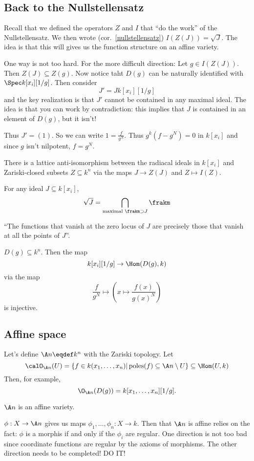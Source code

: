 \documentclass[12pt]{article}
\begin{document}
\subsection{Back to the Nullstellensatz}
Recall that we defined the operators $Z$ and $I$ that ``do the work'' of the Nullstellensatz. We then wrote (cor.~\ref{nullstellensatz}) $I(Z(J))=\sqrt{J}$. The idea is that 
this will gives us the function structure on an affine variety.
\begin{prf}
	One way is not too hard. For the more difficult direction:
	Let $g\in I(Z(J))$. Then $Z(J)\subseteq Z(g)$. Now notice taht $D(g)$ can be naturally identified 
	with $\Spec k[x_i][1/g]$. Then consider
	\[J'=Jk[x_i][1/g]\]
	and the key realization is that $J'$ cannot be contained in any maximal ideal. The idea is that you can work by contradiction:
	this implies that $J$ is contained in an element of $D(g)$, but it isn't!

	Thus $J'=(1)$. So we can write $1=\frac{f}{g^N}$. Thus $g^k(f-g^N)=0$ in $k[x_i]$ and since $g$ isn't nilpotent, $f=g^N$.
\end{prf}
\begin{cor}
	There is a lattice anti-isomorphism between the radiacal ideals in $k[x_i]$ and Zariski-closed 
	subsets $Z\subseteq k^n$ via the maps $J\to Z(J)$ and $Z\mapsto I(Z)$.
\end{cor}
\begin{cor}
	For any ideal $J\subseteq k[x_i]$, 
	\[\sqrt{J}=\bigcap_{\text{maximal } \frakm\supset J}\frakm\]
\end{cor}
\begin{rmk}
	``The functions that vanish at the zero locus of $J$ are precisely those that vanish at all the points of $J$''.
\end{rmk}
\begin{cor}
	$D(g)\subseteq k^n$. Then the map 
	\[k[x_i][1/g]\to \Hom(D(g),k)\]
	via the map 
	\[\frac{f}{g^N}\mapsto \left(x\mapsto \frac{f(x)}{g(x)^N}\right)\]
	is injective.
\end{cor}

\subsection{Affine space}
Let's define $\A n\eqdef k^n$ with the Zariski topology. Let 
\[\calO_{\A n}(U)=\{f\in k(x_1,\dots,x_n)|\operatorname{poles}(f)\subseteq\A n\setminus U\}\subseteq\Hom(U,k)\]
Then, for example,
\[\O_{\A n}(D(g))=k[x_1,\dots,x_n][1/g].\]
\begin{prop}
	$\A n$ is an affine variety.
\end{prop}
\begin{prf}
	$\phi:X\to \A n$ gives us maps $\phi_1,\dots,\phi_n:X\to k$. Then that $\A n$ is affine relies on the fact:
	$\phi$ is a morphis if and only if the $\phi_i$ are regular. One direction is not too bad since coordinate functions 
	are regular by the axioms of morphisms. The other direction needs to be completed! DO IT!
\end{prf}
\end{document}
